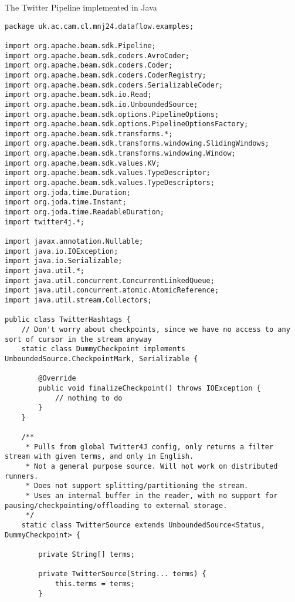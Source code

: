 \begin{codelisting}
\caption{The Twitter Pipeline implemented in Java}
\label{lst:apxb:twitter-java}
\begin{verbatim}
package uk.ac.cam.cl.mnj24.dataflow.examples;

import org.apache.beam.sdk.Pipeline;
import org.apache.beam.sdk.coders.AvroCoder;
import org.apache.beam.sdk.coders.Coder;
import org.apache.beam.sdk.coders.CoderRegistry;
import org.apache.beam.sdk.coders.SerializableCoder;
import org.apache.beam.sdk.io.Read;
import org.apache.beam.sdk.io.UnboundedSource;
import org.apache.beam.sdk.options.PipelineOptions;
import org.apache.beam.sdk.options.PipelineOptionsFactory;
import org.apache.beam.sdk.transforms.*;
import org.apache.beam.sdk.transforms.windowing.SlidingWindows;
import org.apache.beam.sdk.transforms.windowing.Window;
import org.apache.beam.sdk.values.KV;
import org.apache.beam.sdk.values.TypeDescriptor;
import org.apache.beam.sdk.values.TypeDescriptors;
import org.joda.time.Duration;
import org.joda.time.Instant;
import org.joda.time.ReadableDuration;
import twitter4j.*;

import javax.annotation.Nullable;
import java.io.IOException;
import java.io.Serializable;
import java.util.*;
import java.util.concurrent.ConcurrentLinkedQueue;
import java.util.concurrent.atomic.AtomicReference;
import java.util.stream.Collectors;

public class TwitterHashtags {
    // Don't worry about checkpoints, since we have no access to any sort of cursor in the stream anyway
    static class DummyCheckpoint implements UnboundedSource.CheckpointMark, Serializable {

        @Override
        public void finalizeCheckpoint() throws IOException {
            // nothing to do
        }
    }

    /**
     * Pulls from global Twitter4J config, only returns a filter stream with given terms, and only in English.
     * Not a general purpose source. Will not work on distributed runners.
     * Does not support splitting/partitioning the stream.
     * Uses an internal buffer in the reader, with no support for pausing/checkpointing/offloading to external storage.
     */
    static class TwitterSource extends UnboundedSource<Status, DummyCheckpoint> {

        private String[] terms;

        private TwitterSource(String... terms) {
            this.terms = terms;
        }


\end{verbatim}
\end{codelisting}
